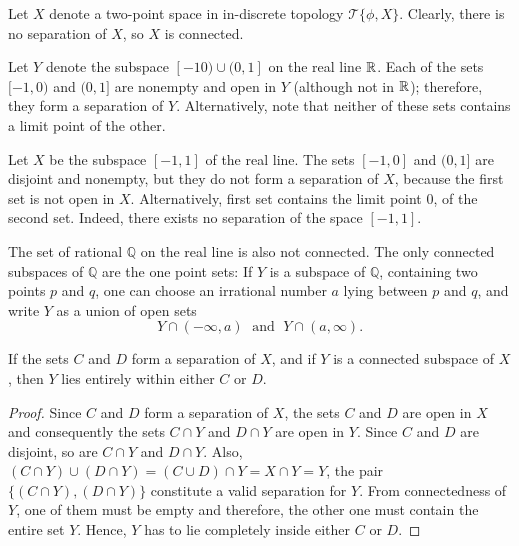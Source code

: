 \documentclass[a4paper,english,12pt]{article}
\begin{document}
\begin{exmp}
Let $X$ denote a two-point space in in-discrete topology $\mathcal{T}\{\phi, X\}$. Clearly, there is no separation of $X$, so $X$ is connected. 
\end{exmp}

\begin{exmp}
Let $Y$ denote the subspace $[-1 0) \cup (0, 1]$ on the real line $\mathbb{R}$. Each of the sets $[-1, 0)$ and $(0, 1]$
are nonempty and open in $Y$ (although not in $\mathbb{R}$); therefore, they form a separation of $Y$. Alternatively, note that 
neither of these sets contains a limit point of the other.
\end{exmp}

\begin{exmp}
 Let $X$ be the subspace $[-1, 1]$ of the real line. The sets $[-1, 0]$ and $(0, 1]$
 are disjoint and nonempty, but they do not form a separation of $X$, because the first set 
 is not open in $X$. Alternatively, first set contains the limit point $0$, of the second set.
 Indeed, there exists no separation of the space $[-1, 1]$.
\end{exmp}

\begin{exmp}
 The set of rational $\mathbb{Q}$ on the real line is also not connected. The only connected subspaces of 
 $\mathbb{Q}$ are the one point sets: If $Y$ is a subspace of $\mathbb{Q}$, containing two points $p$ and $q$,
 one can choose an irrational number $a$ lying between $p$ and $q$, and write $Y$ as a union of open sets 
 \begin{equation}
  Y \cap (- \infty, a) \; \text{ and } \; Y \cap (a, \infty).    
  \nonumber
 \end{equation}
\end{exmp}

\begin{thm} \label{thm_connected_set_enclosure}
 If the sets $C$ and $D$ form a separation of $X$, and if $Y$ is a connected subspace of $X$, then $Y$ lies entirely within 
 either $C$ or $D$.
\end{thm}
\begin{proof}
 Since $C$ and $D$ form a separation of $X$, the sets $C$ and $D$ are open in $X$ and consequently the sets $C \cap Y$ and $D \cap Y$
 are open in $Y$. Since $C$ and $D$ are disjoint, so are $C \cap Y$ and $D \cap Y$. Also, $(C \cap Y) \cup (D \cap Y) = (C \cup D) \cap Y = X \cap Y = Y$,
 the pair $\{(C \cap Y), (D \cap Y) \}$ constitute a valid separation for $Y$. From connectedness of $Y$, one of them must be empty and therefore, the other one 
 must contain the entire set $Y$. Hence, $Y$ has to lie completely inside either $C$ or $D$.
\end{proof}
\end{document}
